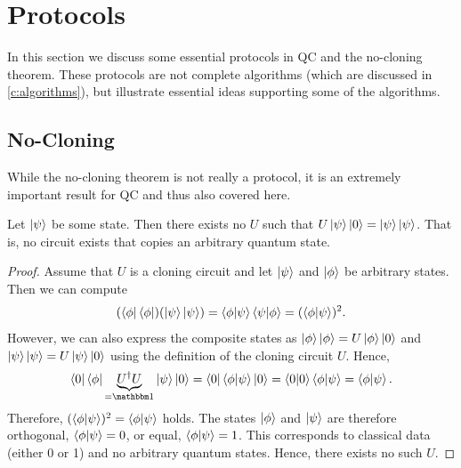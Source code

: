 	\section{Protocols}
		\label{sec:protocols}

		In this section we discuss some essential protocols in \ac{QC} and the no-cloning theorem. These protocols are not complete algorithms (which are discussed in \autoref{c:algorithms}), but illustrate essential ideas supporting some of the algorithms.

		\subsection{No-Cloning}
			While the no-cloning theorem is not really a protocol, it is an extremely important result for \ac{QC} and thus also covered here.

			\begin{theorem}[No-Cloning]
				Let \(\ket{\psi}\) be some state. Then there exists no \(U\) such that \( U \ket{\psi} \ket{0} = \ket{\psi}\ket{\psi} \). That is, no circuit exists that copies an arbitrary quantum state.
			\end{theorem}
			\begin{proof}
				Assume that \(U\) is a cloning circuit and let \(\ket{\psi}\) and \(\ket{\phi}\) be arbitrary states. Then we can compute
				\begin{equation}
					(\bra{\phi}\bra{\phi}) (\ket{\psi}\ket{\psi})
						= \ip{\phi}{\psi} \ip{\psi}{\phi}
						= (\ip{\phi}{\psi})^2.
				\end{equation}
				However, we can also express the composite states as \( \ket{\phi}\ket{\phi} = U \ket{\phi}\ket{0} \) and \( \ket{\psi}\ket{\psi} = U \ket{\psi}\ket{0} \) using the definition of the cloning circuit \(U\). Hence,
				\begin{equation}
					\bra{0}\bra{\phi} \underbrace{U^\dagger U}_{= \ID} \ket{\psi}\ket{0}
						= \bra{0}\bra{\phi} \ket{\psi}\ket{0}
						= \ip{0}{0} \ip{\phi}{\psi}
						= \ip{\phi}{\psi}.
				\end{equation}
				Therefore, \( (\ip{\phi}{\psi})^2 = \ip{\phi}{\psi} \) holds. The states \(\ket{\phi}\) and \(\ket{\psi}\) are therefore orthogonal, \( \ip{\phi}{\psi} = 0 \), or equal, \( \ip{\phi}{\psi} = 1 \). This corresponds to classical data (either \num{0} or \num{1}) and no arbitrary quantum states. Hence, there exists no such \(U\).
			\end{proof}

